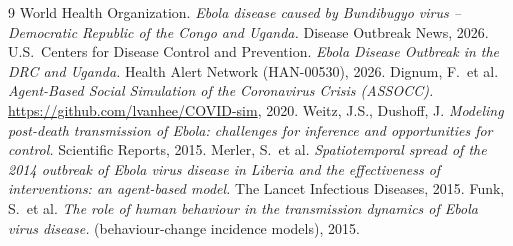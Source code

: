 \documentclass[11pt]{article}
\begin{document}
\begin{thebibliography}{9}
 World Health Organization. \emph{Ebola disease caused by Bundibugyo virus -- Democratic Republic of the Congo and Uganda.} Disease Outbreak News, 2026.
 U.S.\ Centers for Disease Control and Prevention. \emph{Ebola Disease Outbreak in the DRC and Uganda.} Health Alert Network (HAN-00530), 2026.
 Dignum, F.\ et al. \emph{Agent-Based Social Simulation of the Coronavirus Crisis (ASSOCC).} \url{https://github.com/lvanhee/COVID-sim}, 2020.
 Weitz, J.S., Dushoff, J. \emph{Modeling post-death transmission of Ebola: challenges for inference and opportunities for control.} Scientific Reports, 2015.
 Merler, S.\ et al. \emph{Spatiotemporal spread of the 2014 outbreak of Ebola virus disease in Liberia and the effectiveness of interventions: an agent-based model.} The Lancet Infectious Diseases, 2015.
 Funk, S.\ et al. \emph{The role of human behaviour in the transmission dynamics of Ebola virus disease.} (behaviour-change incidence models), 2015.
\end{thebibliography}
\end{document}
